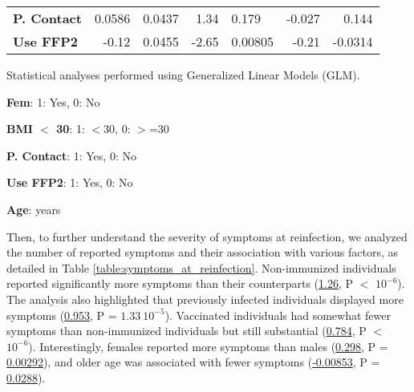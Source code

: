 \documentclass[11pt]{article}
\begin{document}
\begin{table}[h]
\begin{threeparttable}
{\begin{tabular}{lrrrlrr}
\textbf{P. Contact} & \raisebox{2ex}{\hypertarget{A8a}{}}0.0586 & \raisebox{2ex}{\hypertarget{A8b}{}}0.0437 & \raisebox{2ex}{\hypertarget{A8c}{}}1.34 & \raisebox{2ex}{\hypertarget{A8d}{}}0.179 & \raisebox{2ex}{\hypertarget{A8e}{}}-0.027 & \raisebox{2ex}{\hypertarget{A8f}{}}0.144 \\
\textbf{Use FFP2} & \raisebox{2ex}{\hypertarget{A9a}{}}-0.12 & \raisebox{2ex}{\hypertarget{A9b}{}}0.0455 & \raisebox{2ex}{\hypertarget{A9c}{}}-2.65 & \raisebox{2ex}{\hypertarget{A9d}{}}0.00805 & \raisebox{2ex}{\hypertarget{A9e}{}}-0.21 & \raisebox{2ex}{\hypertarget{A9f}{}}-0.0314 \\
\bottomrule
\end{tabular}}
\begin{tablenotes}
\footnotesize
\item Statistical analyses performed using Generalized Linear Models (GLM).
\item \textbf{Fem}: 1: Yes, 0: No
\item \textbf{BMI $<$ 30}: 1: $<$30, 0: $>$=30
\item \textbf{P. Contact}: 1: Yes, 0: No
\item \textbf{Use FFP2}: 1: Yes, 0: No
\item \textbf{Age}: years
\end{tablenotes}
\end{threeparttable}
\end{table}

Then, to further understand the severity of symptoms at reinfection, we analyzed the number of reported symptoms and their association with various factors, as detailed in Table \ref{table:symptoms_at_reinfection}. Non-immunized individuals reported significantly more symptoms than their counterparts (\hyperlink{B1a}{1.26}, P $<$ \hyperlink{B1c}{$10^{-6}$}). The analysis also highlighted that previously infected individuals displayed more symptoms (\hyperlink{B3a}{0.953}, P = \hyperlink{B3c}{$1.33\ 10^{-5}$}). Vaccinated individuals had somewhat fewer symptoms than non-immunized individuals but still substantial (\hyperlink{B2a}{0.784}, P $<$ \hyperlink{B2c}{$10^{-6}$}). Interestingly, females reported more symptoms than males (\hyperlink{B4a}{0.298}, P = \hyperlink{B4c}{0.00292}), and older age was associated with fewer symptoms (\hyperlink{B6a}{-0.00853}, P = \hyperlink{B6c}{0.0288}).
\end{document}
